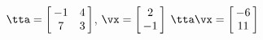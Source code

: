 {$\tta =   \left[\hskip -3pt \begin{array}{cc} -1&4\\  7&3\end {array} \hskip -3pt
 \right] $,\quad  
$\vx = \left[\hskip -3pt \begin{array}{c} 2\\  -1\end{array}\hskip -3pt \right]$}
{$\tta\vx= \left[\hskip -3pt \begin{array}{c} -6\\  11\end {array} \hskip -3pt
\right]$
}
 

 
  



  

  


  

  

 

